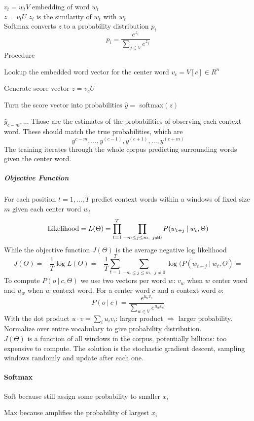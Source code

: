 \documentclass[10pt]{report}
\begin{document}
$v_t = w_tV$ embedding of word $w_t$\\$z=v_tU$ $z_i$ is the similarity of $w_t$ with $w_i$\\Softmax converts $z$ to a probability distribution $p_i$ $$p_i=\frac{e^{z_i}}{\sum_{j\in V}e^{z_j}}$$
Procedure
\begin{list}{}{}
	\item Lookup the embedded word vector for the center word $v_c = V[c] \in R^n$
	\item Generate score vector $z = v_cU$
	\item Turn the score vector into probabilities $\hat{y} =$ softmax$(z)$
\end{list}
$\hat{y}_{c-m},\ldots$ Those are the estimates of the probabilities of observing each context word. These should match the true probabilities, which are $$y^{c-m},\ldots, y^{(c-1)}, y^{(c+1)}, \ldots, y^{(c+m)}$$
The training iterates through the whole corpus predicting surrounding words given the center word.
\subparagraph{Objective Function} For each position $t=1,\ldots,T$ predict context words within a windows of fixed size $m$ given each center word $w_t$ $$\hbox{Likelihood} = L(\Theta) = \prod_{t=1}^T\prod_{-m\leq j\leq m,\:\:j\neq 0} P(w_{t+j}\:|\:w_t,\Theta)$$
While the objective function $J(\Theta)$ is the average negative log likelihood $$J(\Theta) = -\frac{1}{T}\log L(\Theta) = -\frac{1}{T}\sum_{t=1}^T\sum_{-m\leq j\leq m,\:\:j\neq 0} \log(P(w_{t+j}\:|\:w_t,\Theta)=$$
To compute $P(o\:|\:c, \Theta)$ we use two vectors per word $w$: $v_w$ when $w$ center word and $u_w$ when $w$ context word. For a center word $c$ and a context word $o$:$$P(o\:|\:c) = \frac{e^{u_o v_c}}{\sum_{w\in V} e^{u_w v_c}}$$
With the dot product $u\cdot v = \sum_i u_iv_i$: larger product $\Rightarrow$ larger probability. Normalize over entire vocabulary to give probability distribution.\\
$J(\Theta)$ is a function of all windows in the corpus, potentially billions: too expensive to compute. The solution is the stochastic gradient descent, sampling windows randomly and update after each one.
\paragraph{Softmax}\begin{list}{}{}
	\item Soft because still assign some probability to smaller $x_i$
	\item Max because amplifies the probability of largest $x_i$
\end{list}
\end{document}
